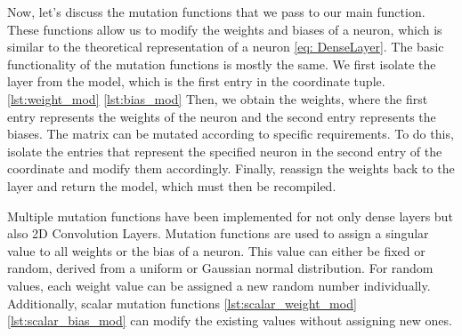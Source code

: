 


Now, let's discuss the mutation functions that we pass to our main function.
These functions allow us to modify the weights and biases of a neuron, which is similar to the theoretical representation of a neuron \ref{eq: DenseLayer}.
The basic functionality of the mutation functions is mostly the same.
We first isolate the layer from the model, which is the first entry in the coordinate tuple. \ref{lst:weight_mod} \ref{lst:bias_mod}
Then, we obtain the weights, where the first entry represents the weights of the neuron and the second entry represents the biases.
The matrix can be mutated according to specific requirements.
To do this, isolate the entries that represent the specified neuron in the second entry of the coordinate and modify them accordingly.
Finally, reassign the weights back to the layer and return the model, which must then be recompiled.




Multiple mutation functions have been implemented for not only dense layers but also 2D Convolution Layers.
Mutation functions are used to assign a singular value to all weights or the bias of a neuron.
This value can either be fixed or random, derived from a uniform or Gaussian normal distribution.
For random values, each weight value can be assigned a new random number individually.
Additionally, scalar mutation functions \ref{lst:scalar_weight_mod} \ref{lst:scalar_bias_mod} can modify the existing values without assigning new ones.


